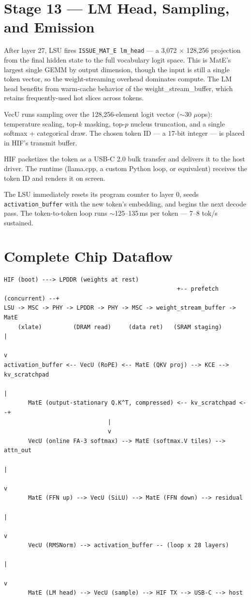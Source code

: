 \documentclass[11pt,letterpaper]{article}
\begin{document}
\section{Stage 13 --- LM Head, Sampling, and Emission}

After layer 27, LSU fires \texttt{ISSUE\_MAT\_E lm\_head} --- a 3{,}072 $\times$ 128{,}256
projection from the final hidden state to the full vocabulary logit space. This is MatE's
largest single GEMM by output dimension, though the input is still a single token vector, so
the weight-streaming overhead dominates compute. The LM head benefits from warm-cache
behavior of the weight\_stream\_buffer, which retains frequently-used hot slices across
tokens.

VecU runs sampling over the 128{,}256-element logit vector ($\sim$30 $\mu$ops): temperature
scaling, top-$k$ masking, top-$p$ nucleus truncation, and a single softmax + categorical
draw. The chosen token ID --- a 17-bit integer --- is placed in HIF's transmit buffer.

HIF packetizes the token as a USB-C 2.0 bulk transfer and delivers it to the host driver. The
runtime (llama.cpp, a custom Python loop, or equivalent) receives the token ID and renders it
on screen.

The LSU immediately resets its program counter to layer 0, seeds \texttt{activation\_buffer}
with the new token's embedding, and begins the next decode pass. The token-to-token loop runs
$\sim$125--135\,ms per token --- 7--8 tok/s sustained.

\section{Complete Chip Dataflow}

\begin{lstlisting}
HIF (boot) ---> LPDDR (weights at rest)
                                                  +-- prefetch (concurrent) --+
LSU -> MSC -> PHY -> LPDDR -> PHY -> MSC -> weight_stream_buffer -> MatE
    (xlate)         (DRAM read)     (data ret)   (SRAM staging)        |
                                                                       v
activation_buffer <-- VecU (RoPE) <-- MatE (QKV proj) --> KCE --> kv_scratchpad
                                                                       |
       MatE (output-stationary Q.K^T, compressed) <-- kv_scratchpad <--+
                              |
                              v
       VecU (online FA-3 softmax) --> MatE (softmax.V tiles) --> attn_out
                                                                       |
                                                                       v
       MatE (FFN up) --> VecU (SiLU) --> MatE (FFN down) --> residual
                                                                       |
                                                                       v
       VecU (RMSNorm) --> activation_buffer -- (loop x 28 layers)
                                                                       |
                                                                       v
       MatE (LM head) --> VecU (sample) --> HIF TX --> USB-C --> host
\end{lstlisting}
\end{document}
